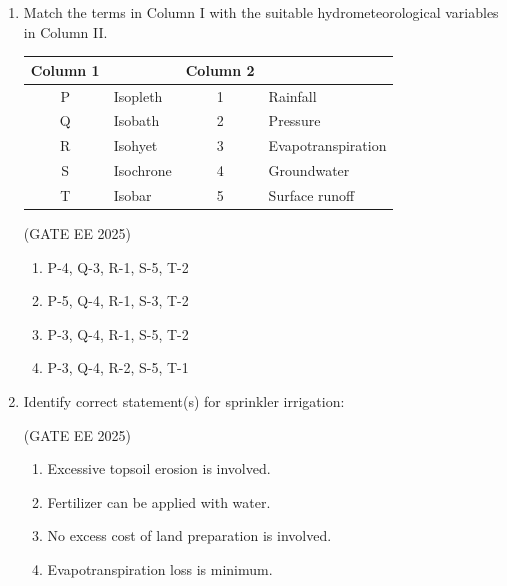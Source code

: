 \documentclass[journal,12pt,onecolumn]{IEEEtran}
\theoremstyle{remark}
\begin{document}
\begin{enumerate}
\hfill(GATE EE 2025)

\begin{multicols}{2}
\begin{enumerate}
\item Low yields of crops
\item Increased infiltration leading to waterlogging
\item Poor quality of fodder
\item Limited type of crops can be grown
\end{enumerate}
\end{multicols}

\item Match the terms in Column I with the suitable hydrometeorological variables in Column II.
\begin{center}
\begin{tabular}{|c|l|c|l|}
\hline
\textbf{Column 1} & & \textbf{Column 2} & \\ \hline
P & Isopleth & 1 & Rainfall \\ \hline
Q & Isobath & 2 & Pressure \\ \hline
R & Isohyet & 3 & Evapotranspiration \\ \hline
S & Isochrone & 4 & Groundwater \\ \hline
T & Isobar & 5 & Surface runoff \\ \hline
\end{tabular}
\end{center}

\hfill(GATE EE 2025)

\begin{multicols}{2}
\begin{enumerate}
\item P-4, Q-3, R-1, S-5, T-2
\item P-5, Q-4, R-1, S-3, T-2
\item P-3, Q-4, R-1, S-5, T-2
\item P-3, Q-4, R-2, S-5, T-1
\end{enumerate}
\end{multicols}

\item Identify correct statement(s) for sprinkler irrigation:

\hfill(GATE EE 2025)

\begin{multicols}{2}
\begin{enumerate}
\item Excessive topsoil erosion is involved.
\item Fertilizer can be applied with water.
\item No excess cost of land preparation is involved.
\item Evapotranspiration loss is minimum.
\end{enumerate}
\end{multicols}


\end{enumerate}
\end{document}
